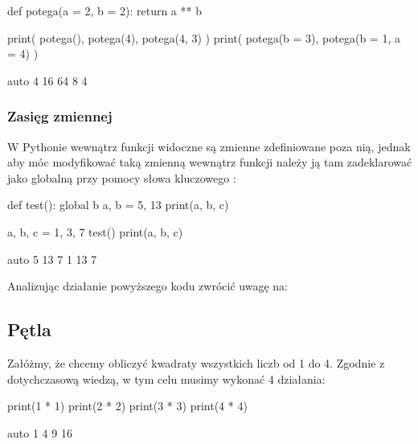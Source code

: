 \documentclass{pdfBooklets}
\begin{document}
\begin{CodeFrame}[python]{.65\textwidth}
def potega(a = 2, b = 2):
    return a ** b

print( potega(), potega(4), potega(4, 3) )
print( potega(b = 3), potega(b = 1, a = 4) )
\end{CodeFrame}
\begin{CodeFrame}{auto}
4 16 64
8 4
\end{CodeFrame}

\subsubsection{Zasięg zmiennej {\Symbola 🤔}}

W Pythonie wewnątrz funkcji widoczne są zmienne zdefiniowane poza nią, jednak aby móc modyfikować taką zmienną wewnątrz
funkcji należy ją tam zadeklarować jako globalną przy pomocy słowa kluczowego :

\begin{CodeFrame}[python]{.5\textwidth}
def test():
  global b
  a, b = 5, 13
  print(a, b, c)

a, b, c = 1, 3, 7
test()
print(a, b, c)
\end{CodeFrame}
\begin{CodeFrame}{auto}
5 13 7
1 13 7
\end{CodeFrame}

\noindent
Analizując działanie powyższego kodu zwrócić uwagę na:

\subsection{Pętla }
Załóżmy, że chcemy obliczyć kwadraty wszystkich liczb od 1 do 4.
Zgodnie z dotychczasową wiedzą, w tym celu musimy wykonać 4 działania:

\begin{CodeFrame}[python]{.5\textwidth}
print(1 * 1)
print(2 * 2)
print(3 * 3)
print(4 * 4)
\end{CodeFrame}
\begin{CodeFrame}{auto}
1
4
9
16
\end{CodeFrame}
\end{document}
